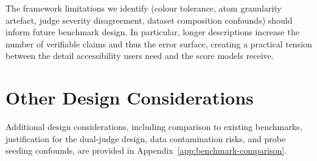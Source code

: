 The framework limitations we identify (colour tolerance, atom granularity artefact, judge severity disagreement, dataset composition confounds) should inform future benchmark design.
In particular, longer descriptions increase the number of verifiable claims and thus the error surface, creating a practical tension between the detail accessibility users need and the score models receive.

\section{Other Design Considerations}\label{sec:disc-design}

Additional design considerations, including comparison to existing benchmarks, justification for the dual-judge design, data contamination risks, and probe seeding confounds, are provided in Appendix~\ref{app:benchmark-comparison}.
